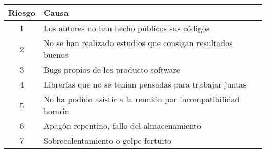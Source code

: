 \begin{table}[h]
\centering
\begin{tabular}{|c|l|}
\hline
\rowcolor[HTML]{C0C0C0} 
{\color[HTML]{000000} \textbf{Riesgo}} & {\color[HTML]{000000} \textbf{Causa}}                                \\ \hline
\rowcolor[HTML]{EFEFEF} 
{\color[HTML]{000000} 1}               & {\color[HTML]{000000} Los autores no han hecho públicos sus códigos} \\ \hline
\rowcolor[HTML]{EFEFEF} 
{\color[HTML]{000000} 2} & {\color[HTML]{000000} No se han realizado estudios que consigan resultados buenos}    \\ \hline
\rowcolor[HTML]{EFEFEF} 
{\color[HTML]{000000} 3}               & {\color[HTML]{000000} Bugs propios de los producto software}         \\ \hline
\rowcolor[HTML]{EFEFEF} 
{\color[HTML]{000000} 4} & {\color[HTML]{000000} Librerías que no se tenían pensadas para trabajar juntas}       \\ \hline
\rowcolor[HTML]{EFEFEF} 
{\color[HTML]{000000} 5} & {\color[HTML]{000000} No ha podido asistir a la reunión por incompatibilidad horaria} \\ \hline
\rowcolor[HTML]{EFEFEF} 
{\color[HTML]{000000} 6}               & {\color[HTML]{000000} Apagón repentino, fallo del almacenamiento}    \\ \hline
\rowcolor[HTML]{EFEFEF} 
{\color[HTML]{000000} 7}               & {\color[HTML]{000000} Sobrecalentamiento o golpe fortuito}           \\ \hline
\end{tabular}
\end{table}

